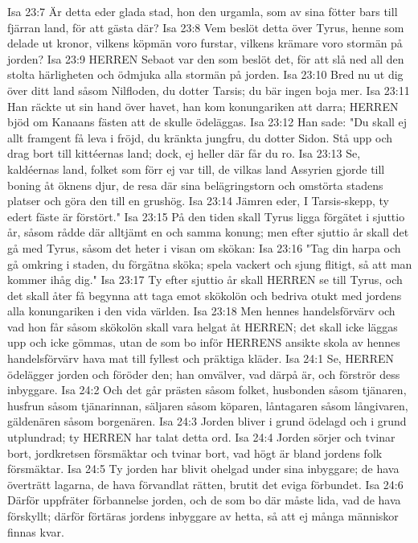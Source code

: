 Isa 23:7  Är detta eder glada stad, hon den urgamla, som av sina fötter bars till fjärran land, för att gästa där?
Isa 23:8  Vem beslöt detta över Tyrus, henne som delade ut kronor, vilkens köpmän voro furstar, vilkens krämare voro stormän på jorden?
Isa 23:9  HERREN Sebaot var den som beslöt det, för att slå ned all den stolta härligheten och ödmjuka alla stormän på jorden.
Isa 23:10  Bred nu ut dig över ditt land såsom Nilfloden, du dotter Tarsis; du bär ingen boja mer.
Isa 23:11  Han räckte ut sin hand över havet, han kom konungariken att darra; HERREN bjöd om Kanaans fästen att de skulle ödeläggas.
Isa 23:12  Han sade: "Du skall ej allt framgent få leva i fröjd, du kränkta jungfru, du dotter Sidon. Stå upp och drag bort till kittéernas land; dock, ej heller där får du ro.
Isa 23:13  Se, kaldéernas land, folket som förr ej var till, de vilkas land Assyrien gjorde till boning åt öknens djur, de resa där sina belägringstorn och omstörta stadens platser och göra den till en grushög.
Isa 23:14  Jämren eder, I Tarsis-skepp, ty edert fäste är förstört."
Isa 23:15  På den tiden skall Tyrus ligga förgätet i sjuttio år, såsom rådde där alltjämt en och samma konung; men efter sjuttio år skall det gå med Tyrus, såsom det heter i visan om skökan:
Isa 23:16  "Tag din harpa och gå omkring i staden, du förgätna sköka; spela vackert och sjung flitigt, så att man kommer ihåg dig."
Isa 23:17  Ty efter sjuttio år skall HERREN se till Tyrus, och det skall åter få begynna att taga emot skökolön och bedriva otukt med jordens alla konungariken i den vida världen.
Isa 23:18  Men hennes handelsförvärv och vad hon får såsom skökolön skall vara helgat åt HERREN; det skall icke läggas upp och icke gömmas, utan de som bo inför HERRENS ansikte skola av hennes handelsförvärv hava mat till fyllest och präktiga kläder.
Isa 24:1  Se, HERREN ödelägger jorden och föröder den; han omvälver, vad därpå är, och förströr dess inbyggare.
Isa 24:2  Och det går prästen såsom folket, husbonden såsom tjänaren, husfrun såsom tjänarinnan, säljaren såsom köparen, låntagaren såsom långivaren, gäldenären såsom borgenären.
Isa 24:3  Jorden bliver i grund ödelagd och i grund utplundrad; ty HERREN har talat detta ord.
Isa 24:4  Jorden sörjer och tvinar bort, jordkretsen försmäktar och tvinar bort, vad högt är bland jordens folk försmäktar.
Isa 24:5  Ty jorden har blivit ohelgad under sina inbyggare; de hava överträtt lagarna, de hava förvandlat rätten, brutit det eviga förbundet.
Isa 24:6  Därför uppfräter förbannelse jorden, och de som bo där måste lida, vad de hava förskyllt; därför förtäras jordens inbyggare av hetta, så att ej många människor finnas kvar.
